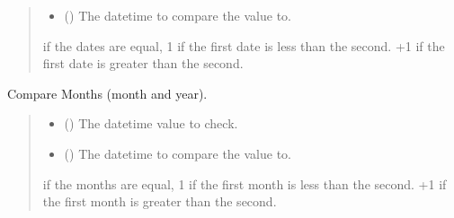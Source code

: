 \documentclass[letterpaper,10pt,english]{sphinxmanual}
\begin{document}
\begin{fulllineitems}
\begin{fulllineitems}
\begin{quote}
\begin{description}
\begin{itemize}
\item {} 
\sphinxAtStartPar
{} () \textendash{} The datetime to compare the value to.

\end{itemize}

 if the dates are equal,
\sphinxhyphen{}1 if the first date is less than the second.
+1 if the first date is greater than the second.

\end{description}\end{quote}

\end{fulllineitems}


\begin{fulllineitems}
\label{\detokenize{apache_commons_validator_python.routines:apache_commons_validator_python.routines.calendar_validator.CalendarValidator.compare_months}}
\pysigstartsignatures
{}
\pysigstopsignatures
\sphinxAtStartPar
Compare Months (month and year).
\begin{quote}\begin{description}
\begin{itemize}
\item {} 
\sphinxAtStartPar
{} () \textendash{} The datetime value to check.

\item {} 
\sphinxAtStartPar
{} () \textendash{} The datetime to compare the value to.

\end{itemize}

 if the months are equal,
\sphinxhyphen{}1 if the first month is less than the second.
+1 if the first month is greater than the second.


\end{description}
\end{quote}
\end{fulllineitems}
\end{fulllineitems}
\end{document}
